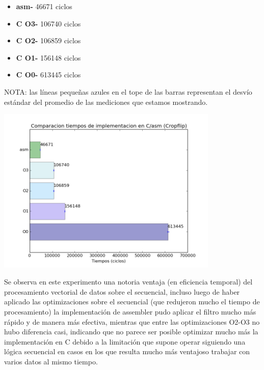 \documentclass[a4paper]{article}
\begin{document}
\begin{itemize}

\item \textbf{asm-} 46671 ciclos\\
\item \textbf{C O3-} 106740 ciclos\\
\item \textbf{C O2-} 106859 ciclos\\
\item \textbf{C O1-} 156148 ciclos\\
\item \textbf{C O0-} 613445 ciclos\\

\end{itemize}

NOTA: las l\'{i}neas peque\~nas azules en el tope de las barras representan el desv\'{i}o est\'{a}ndar del promedio de las mediciones que estamos mostrando.

\includegraphics[width=300pt]{imagenes/CompCasm1.png}

Se observa en este experimento una notoria ventaja (en eficiencia temporal) del procesamiento vectorial de datos sobre el secuencial, incluso luego de haber aplicado las optimizaciones sobre el secuencial (que redujeron mucho el tiempo de procesamiento) la implementaci\'{o}n de assembler pudo aplicar el filtro mucho m\'{a}s r\'{a}pido y de manera m\'{a}s efectiva, mientras que entre las optimizaciones O2-O3 no hubo diferencia casi, indicando que no parece ser posible optimizar mucho m\'{a}s la implementaci\'{o}n en C debido a la limitaci\'{o}n que supone operar siguiendo una l\'{o}gica secuencial en casos en los que resulta mucho m\'{a}s ventajoso trabajar con varios datos al mismo tiempo.\\ \\ \\ \\
\end{document}
